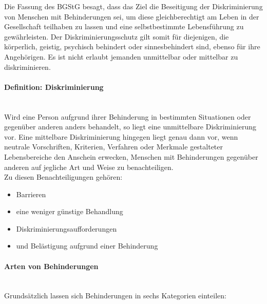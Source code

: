 Die Fassung des BGStG besagt, dass das Ziel die Beseitigung der Diskriminierung von Menschen mit Behinderungen sei, um diese gleichberechtigt am Leben in der Gesellschaft teilhaben zu lassen und eine selbstbestimmte Lebensführung zu gewährleisten. Der Diskriminierungsschutz gilt somit für diejenigen, die körperlich, geistig, psychisch behindert oder sinnesbehindert sind, ebenso für ihre Angehörigen. Es ist nicht erlaubt jemanden unmittelbar oder mittelbar zu diskriminieren.

\paragraph{Definition: Diskriminierung}\mbox{}\\
Wird eine Person aufgrund ihrer Behinderung in bestimmten Situationen oder gegenüber anderen anders behandelt, so liegt eine unmittelbare Diskriminierung vor. Eine mittelbare Diskriminierung hingegen liegt genau dann vor, wenn neutrale Vorschriften, Kriterien, Verfahren oder Merkmale gestalteter Lebensbereiche den Anschein erwecken, Menschen mit Behinderungen gegenüber anderen auf jegliche Art und Weise zu benachteiligen.\\
Zu diesen Benachteiligungen gehören: 
\begin{itemize}
    \item Barrieren
    \item eine weniger günstige Behandlung
    \item Diskriminierungsaufforderungen
    \item und Belästigung aufgrund einer Behinderung
\end{itemize}

\paragraph{Arten von Behinderungen}\mbox{}\\
Grundsätzlich lassen sich Behinderungen in sechs Kategorien einteilen:

